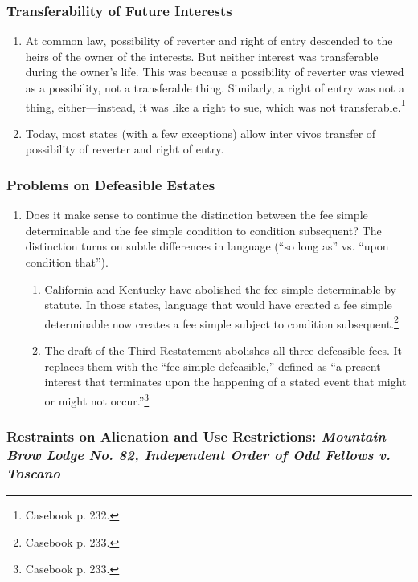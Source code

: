 \subsubsection{Transferability of Future Interests}

\begin{enumerate}
    \item At common law, possibility of reverter and right of entry descended 
    to the heirs of the owner of the interests. But neither interest was 
    transferable during the owner's life. This was because a possibility of 
    reverter was viewed as a possibility, not a transferable thing. Similarly, 
    a right of entry was not a thing, either---instead, it was like a right to 
    sue, which was not transferable.\footnote{Casebook p. 232.}
    \item Today, most states (with a few exceptions) allow inter vivos 
    transfer of possibility of reverter and right of entry.
\end{enumerate}

\subsubsection{Problems on Defeasible Estates}

\begin{enumerate}
    \item Does it make sense to continue the distinction between the fee 
    simple determinable and the fee simple condition to condition subsequent? 
    The distinction turns on subtle differences in language (``so long as'' 
    vs. ``upon condition that'').
    \begin{enumerate}
        \item California and Kentucky have abolished the fee simple 
        determinable by statute. In those states, language that would have 
        created a fee simple determinable now creates a fee simple subject to 
        condition subsequent.\footnote{Casebook p. 233.}
        \item The draft of the Third Restatement abolishes all three 
        defeasible fees. It replaces them with the ``fee simple defeasible,'' 
        defined as ``a present interest that terminates upon the happening of 
        a stated event that might or might not occur.''\footnote{Casebook p. 
        233.}
    \end{enumerate}
\end{enumerate}

\subsubsection{Restraints on Alienation and Use Restrictions: \emph{Mountain 
Brow Lodge No. 82, Independent Order of Odd Fellows v. Toscano}}


